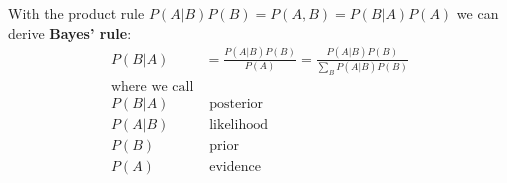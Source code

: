 \documentclass[../main/Notes.tex]{subfiles}
\begin{document}
With the product rule $P(A|B)P(B) = P(A, B) = P(B|A)P(A)$ we can derive \textbf{Bayes' rule}:
\begin{align*}
P(B|A) &= \frac{P(A|B)P(B)}{P(A)} = \frac{P(A|B)P(B)}{\sum\limits_B P(A|B)P(B)} \\
\mbox{where we call}   & \\
P(B|A)  &\mbox{ posterior} \\
P(A|B)  &\mbox{ likelihood} \\
P(B)    &\mbox{ prior} \\
P(A)    &\mbox{ evidence}
\end{align*}
\end{document}
